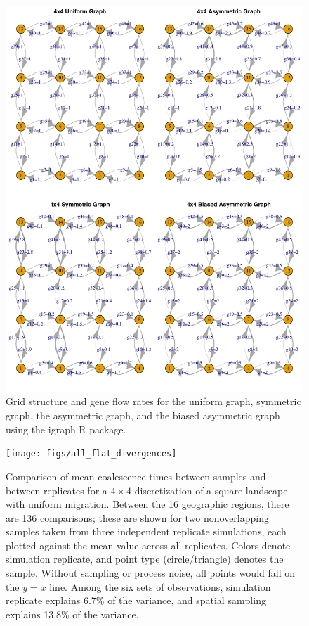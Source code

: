 \documentclass{article}
\begin{document}
\begin{figure}
\centering
     \includegraphics[scale=.7]{figs/4x4_grids}
    \caption{
        Grid structure and gene flow rates
        for the uniform graph, symmetric graph, the asymmetric graph,
        and the biased asymmetric graph 
        using the igraph R package.
    }
    \label{fig:4x4_grids}
\end{figure}


\begin{figure}
\centering
    \texttt{[image: figs/all\_flat\_divergences]}
\caption{
    Comparison of mean coalescence times between samples and between replicates
    for a $4 \times 4$ discretization of a square landscape with uniform migration.
    Between the 16 geographic regions, there are 136 comparisons;
    these are shown for two nonoverlapping samples taken from three independent replicate simulations,
    each plotted against the mean value across all replicates.
    Colors denote simulation replicate,
    and point type (circle/triangle) denotes the sample.
    Without sampling or process noise, all points would fall on the $y=x$ line.
    Among the six sets of observations,
    simulation replicate explains 6.7\% of the variance,
    and spatial sampling explains 13.8\% of the variance.
    } \label{fig:h_val_comp}
\end{figure}
\end{document}

